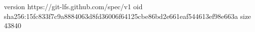 version https://git-lfs.github.com/spec/v1
oid sha256:15fc833f7c9a8884063d8fd36006f64125cbe86bd2e661eaf544613ef98e663a
size 43840
